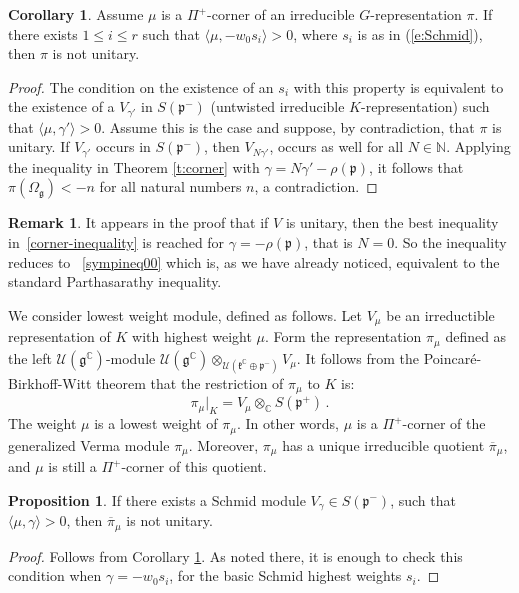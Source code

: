 \documentclass{amsart}[draft,11pt]
\newcommand{\fg}{{\mathfrak{g}}}
\newcommand{\fp}{{\mathfrak{p}}}
\numberwithin{equation}{section}
\theoremstyle{definition}
\newtheorem{corollary}[theorem]{Corollary}
\newtheorem{proposition}[theorem]{Proposition}
\newtheorem{remark}[theorem]{Remark}
\begin{document}
\begin{corollary}\label{c:corner} Assume $\mu$ is a $\Pi^+$-corner of an irreducible $G$-representation $\pi$. If there exists $1\le i\le r$ such that $\langle \mu,-w_0s_i\rangle>0$, where $s_i$ is as in (\ref{e:Schmid}),  then $\pi$ is not unitary.
\end{corollary}

\begin{proof}
The condition on the existence of an $s_i$ with this property is equivalent to the existence of a $V_{\gamma'}$ in $S(\fp^-)$ (untwisted irreducible $K$-representation) such that $\langle\mu,\gamma'\rangle>0$. Assume this is the case and suppose, by contradiction, that $\pi$ is unitary. If $V_{\gamma'}$ occurs in $S(\fp^-)$, then $V_{N\gamma'}$, occurs as well for all $N\in\mathbb N$. Applying the inequality in Theorem \ref{t:corner} with $\gamma=N\gamma'-\rho(\fp)$, it follows that  $\pi(\Omega_\fg)<-n$ for all natural numbers $n$, a contradiction.
\end{proof}

\begin{remark}
It appears in the proof that if $V$ is unitary, then the best inequality in~\eqref{corner-inequality} is reached for $\gamma=-\rho(\fp)$, that is $N=0$. So the inequality reduces to ~\eqref{sympineq00} which is, as we have already noticed, equivalent to the standard Parthasarathy inequality.
\end{remark}

We consider lowest weight module, defined as follows. Let
$V_\mu$ be an irreductible representation of $K$ with highest weight $\mu$.
Form the representation $\pi_{\mu}$ defined as the left $\mathcal{U}(\fg^\mathbb{C})$-module $\mathcal{U}(\fg^\mathbb{C}) \otimes_{\mathcal{U}(\mathfrak{k}^\mathbb{C} \oplus \mathfrak{p}^-)} V_{\mu}$. 
It follows from the Poincar\'e-Birkhoff-Witt theorem that the restriction of $\pi_\mu$ to $K$ is:
\begin{equation}
    \pi_{\mu}|_K = V_{\mu} \otimes_{\mathbb{C}} S(\mathfrak{p}^+)\,.
\end{equation}
The weight $\mu$ is a lowest weight
of $\pi_\mu$. In other words, $\mu$ is a $\Pi^+$-corner of the generalized Verma module $\pi_\mu$. Moreover, $\pi_\mu$ has a unique irreducible quotient $\overline{\pi}_\mu$, and $\mu$ is still a $\Pi^+$-corner of this quotient.

\begin{proposition}
If there exists a Schmid module $V_\gamma \in S(\fp^-)$, 
such that 
$\langle \mu,\gamma\rangle > 0$, then $\overline{\pi}_\mu$ is
not unitary.
\end{proposition}
\begin{proof}
Follows from Corollary \ref{c:corner}. As noted there, it is enough to check this condition when $\gamma=-w_0s_i$, for the basic Schmid highest weights $s_i$.
\end{proof}
\end{document}
